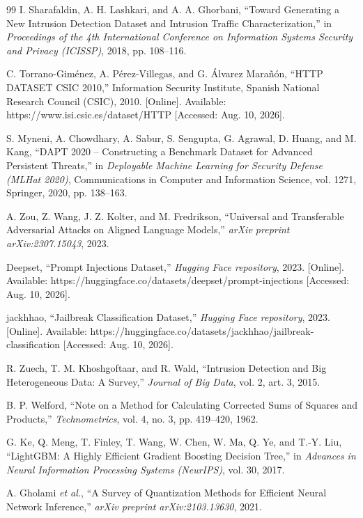 \documentclass[12pt,a4paper]{report}
\begin{document}
\begin{thebibliography}{99}
I. Sharafaldin, A. H. Lashkari, and A. A. Ghorbani, ``Toward Generating a New Intrusion Detection Dataset and Intrusion Traffic Characterization,'' in \textit{Proceedings of the 4th International Conference on Information Systems Security and Privacy (ICISSP)}, 2018, pp. 108--116.

C. Torrano-Giménez, A. Pérez-Villegas, and G. Álvarez Marañón, ``HTTP DATASET CSIC 2010,'' Information Security Institute, Spanish National Research Council (CSIC), 2010. [Online]. Available: https://www.isi.csic.es/dataset/HTTP [Accessed: Aug. 10, 2026].

S. Myneni, A. Chowdhary, A. Sabur, S. Sengupta, G. Agrawal, D. Huang, and M. Kang, ``DAPT 2020 -- Constructing a Benchmark Dataset for Advanced Persistent Threats,'' in \textit{Deployable Machine Learning for Security Defense (MLHat 2020)}, Communications in Computer and Information Science, vol. 1271, Springer, 2020, pp. 138--163.

A. Zou, Z. Wang, J. Z. Kolter, and M. Fredrikson, ``Universal and Transferable Adversarial Attacks on Aligned Language Models,'' \textit{arXiv preprint arXiv:2307.15043}, 2023.

Deepset, ``Prompt Injections Dataset,'' \textit{Hugging Face repository}, 2023. [Online]. Available: https://huggingface.co/datasets/deepset/prompt-injections [Accessed: Aug. 10, 2026].

jackhhao, ``Jailbreak Classification Dataset,'' \textit{Hugging Face repository}, 2023. [Online]. Available: https://huggingface.co/datasets/jackhhao/jailbreak-classification [Accessed: Aug. 10, 2026].

R. Zuech, T. M. Khoshgoftaar, and R. Wald, ``Intrusion Detection and Big Heterogeneous Data: A Survey,'' \textit{Journal of Big Data}, vol. 2, art. 3, 2015.

B. P. Welford, ``Note on a Method for Calculating Corrected Sums of Squares and Products,'' \textit{Technometrics}, vol. 4, no. 3, pp. 419--420, 1962.

G. Ke, Q. Meng, T. Finley, T. Wang, W. Chen, W. Ma, Q. Ye, and T.-Y. Liu, ``LightGBM: A Highly Efficient Gradient Boosting Decision Tree,'' in \textit{Advances in Neural Information Processing Systems (NeurIPS)}, vol. 30, 2017.

A. Gholami \textit{et al.}, ``A Survey of Quantization Methods for Efficient Neural Network Inference,'' \textit{arXiv preprint arXiv:2103.13630}, 2021.


\end{thebibliography}
\end{document}
